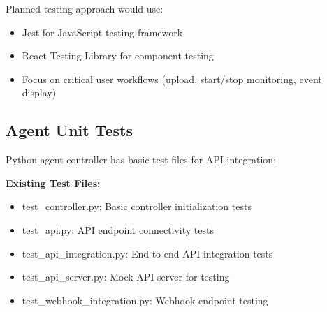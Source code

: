Planned testing approach would use:
\begin{itemize}
    \item Jest for JavaScript testing framework
    \item React Testing Library for component testing
    \item Focus on critical user workflows (upload, start/stop monitoring, event display)
\end{itemize}

\subsection{Agent Unit Tests}

Python agent controller has basic test files for API integration:

\textbf{Existing Test Files:}
\begin{itemize}
    \item test\_controller.py: Basic controller initialization tests
    \item test\_api.py: API endpoint connectivity tests
    \item test\_api\_integration.py: End-to-end API integration tests
    \item test\_api\_server.py: Mock API server for testing
    \item test\_webhook\_integration.py: Webhook endpoint testing
\end{itemize}

